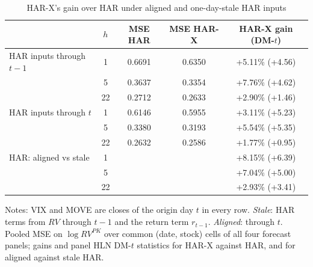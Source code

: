 \begin{table}[htbp]
\centering
\caption{HAR-X's gain over HAR under aligned and one-day-stale HAR inputs}
\label{tab:timing}
\small
\begin{tabular}{lcccc}
\toprule
& $h$ & MSE HAR & MSE HAR-X & HAR-X gain (DM-$t$) \\
\midrule
HAR inputs through $t-1$ & 1 & 0.6691 & 0.6350 & +5.11\% (+4.56) \\
 & 5 & 0.3637 & 0.3354 & +7.76\% (+4.62) \\
 & 22 & 0.2712 & 0.2633 & +2.90\% (+1.46) \\
\midrule
HAR inputs through $t$ & 1 & 0.6146 & 0.5955 & +3.11\% (+5.23) \\
 & 5 & 0.3380 & 0.3193 & +5.54\% (+5.35) \\
 & 22 & 0.2632 & 0.2586 & +1.77\% (+0.95) \\
\midrule
HAR: aligned vs stale & 1 & & & +8.15\% (+6.39) \\
 & 5 & & & +7.04\% (+5.00) \\
 & 22 & & & +2.93\% (+3.41) \\
\bottomrule
\end{tabular}
\begin{tablenotes}\small
\item Notes: VIX and MOVE are closes of the origin day $t$ in every row. \emph{Stale}: HAR terms from $RV$ through $t-1$ and the return term $r_{t-1}$. \emph{Aligned}: through $t$. Pooled MSE on $\log RV^{PK}$ over common (date, stock) cells of all four forecast panels; gains and panel HLN DM-$t$ statistics for HAR-X against HAR, and for aligned against stale HAR.
\end{tablenotes}
\end{table}
